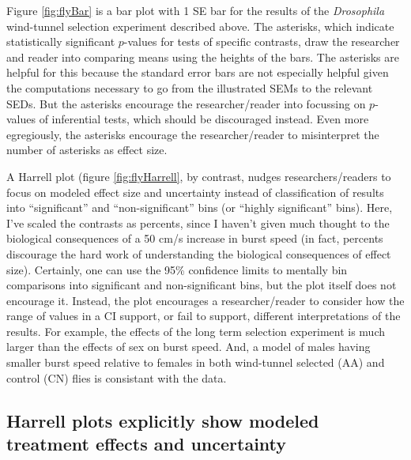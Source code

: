 \documentclass[]{article}
\theoremstyle{definition}
\theoremstyle{definition}
\theoremstyle{definition}
\theoremstyle{remark}
\begin{document}
Figure \ref{fig:flyBar} is a bar plot with 1 SE bar for the results of
the \emph{Drosophila} wind-tunnel selection experiment described above.
The asterisks, which indicate statistically significant \(p\)-values for
tests of specific contrasts, draw the researcher and reader into
comparing means using the heights of the bars. The asterisks are helpful
for this because the standard error bars are not especially helpful
given the computations necessary to go from the illustrated SEMs to the
relevant SEDs. But the asterisks encourage the researcher/reader into
focussing on \(p\)-values of inferential tests, which should be
discouraged instead. Even more egregiously, the asterisks encourage the
researcher/reader to misinterpret the number of asterisks as effect
size.

A Harrell plot (figure \ref{fig:flyHarrell}, by contrast, nudges
researchers/readers to focus on modeled effect size and uncertainty
instead of classification of results into ``significant'' and
``non-significant'' bins (or ``highly significant'' bins). Here, I've
scaled the contrasts as percents, since I haven't given much thought to
the biological consequences of a 50 cm/s increase in burst speed (in
fact, percents discourage the hard work of understanding the biological
consequences of effect size). Certainly, one can use the 95\% confidence
limits to mentally bin comparisons into significant and non-significant
bins, but the plot itself does not encourage it. Instead, the plot
encourages a researcher/reader to consider how the range of values in a
CI support, or fail to support, different interpretations of the
results. For example, the effects of the long term selection experiment
is much larger than the effects of sex on burst speed. And, a model of
males having smaller burst speed relative to females in both wind-tunnel
selected (AA) and control (CN) flies is consistant with the data.

\subsection*{Harrell plots explicitly show modeled treatment effects and
uncertainty}\label{harrell-plots-explicitly-show-modeled-treatment-effects-and-uncertainty}
\end{document}
